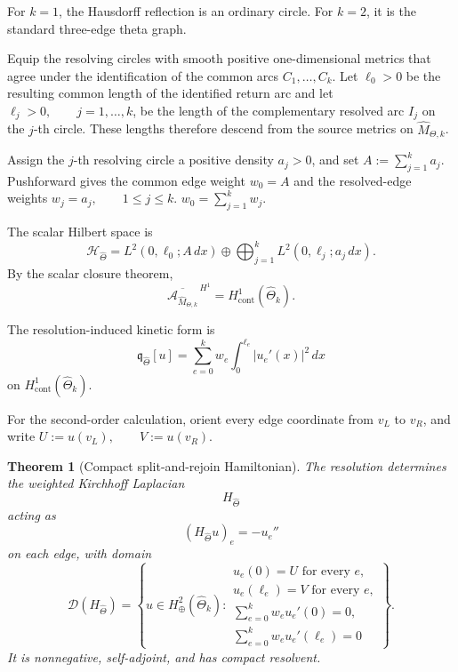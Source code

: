 \documentclass[11pt]{article}
\theoremstyle{plain}
\newtheorem{theorem}{Theorem}[section]
\theoremstyle{definition}
\begin{document}
For \(k=1\), the Hausdorff reflection is an ordinary circle. For \(k=2\),
it is the standard three-edge theta graph.

Equip the resolving circles with smooth positive one-dimensional metrics
that agree under the identification of the common arcs
\(C_1,\ldots,C_k\). Let \(\ell_0>0\) be the resulting common length of the identified return arc and let
\(\ell_j>0, \qquad j=1,\ldots,k\),
be the length of the complementary resolved arc \(I_j\) on the \(j\)-th
circle. These lengths therefore descend from the source metrics on
\(\widehat M_{\Theta,k}\).

Assign the \(j\)-th resolving circle a positive density
\(a_j>0\),
and set
\(A:=\sum_{j=1}^{k}a_j\).
Pushforward gives the common edge weight \(w_0=A\) and the resolved-edge weights
\(w_j=a_j, \qquad 1\leq j\leq k\).
\(w_0=\sum_{j=1}^{k}w_j\).

The scalar Hilbert space is
\[
  \mathcal H_{\widehat\Theta}
  =
  L^2(0,\ell_0;A\,dx)
  \oplus
  \bigoplus_{j=1}^{k}
  L^2(0,\ell_j;a_j\,dx).
\]
By the scalar closure theorem,
\[
  \overline{\mathcal A_{\widehat M_{\Theta,k}}}^{\,H^1}
  =
  H^1_{\mathrm{cont}}(\widehat\Theta_k).
\]

The resolution-induced kinetic form is
\[
  \mathfrak q_{\widehat\Theta}[u]
  =
  \sum_{e=0}^{k}
  w_e
  \int_0^{\ell_e}|u_e'(x)|^2\,dx
\]
on
\(H^1_{\mathrm{cont}}(\widehat\Theta_k)\).

For the second-order calculation, orient every edge coordinate from
\(v_L\) to \(v_R\), and write
\(U:=u(v_L), \qquad V:=u(v_R)\).

\begin{theorem}[Compact split-and-rejoin Hamiltonian]
\label{thm:compact-theta-Hamiltonian}
The resolution determines the weighted Kirchhoff Laplacian
\[
  H_{\widehat\Theta}
\]
acting as
\[
  (H_{\widehat\Theta}u)_e=-u_e''
\]
on each edge, with domain
\[
  \mathcal D(H_{\widehat\Theta})
  =
  \left\{
    u\in H^2_\oplus(\widehat\Theta_k):
    \begin{array}{l}
      u_e(0)=U
      \text{ for every }e,\\[1mm]
      u_e(\ell_e)=V
      \text{ for every }e,\\[1mm]
      \displaystyle
      \sum_{e=0}^{k}w_eu_e'(0)=0,\\[3mm]
      \displaystyle
      \sum_{e=0}^{k}w_eu_e'(\ell_e)=0
    \end{array}
  \right\}.
\]
It is nonnegative, self-adjoint, and has compact resolvent.
\end{theorem}
\end{document}
